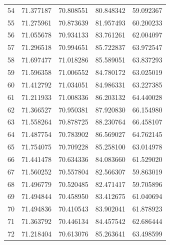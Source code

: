 \begin{table}
\begin{tabular}{rrrrr}
54 & 71.377187 & 70.808551 & 80.848342 & 59.092367 \\
55 & 71.275961 & 70.873639 & 81.957493 & 60.200233 \\
56 & 71.055678 & 70.934133 & 83.761261 & 62.004097 \\
57 & 71.296518 & 70.994651 & 85.722837 & 63.972547 \\
58 & 71.697477 & 71.018286 & 85.589051 & 63.837293 \\
59 & 71.596358 & 71.006552 & 84.780172 & 63.025019 \\
60 & 71.412792 & 71.034051 & 84.986331 & 63.227385 \\
61 & 71.211933 & 71.008336 & 86.203132 & 64.440028 \\
62 & 71.366527 & 70.950381 & 87.920830 & 66.154980 \\
63 & 71.558264 & 70.878725 & 88.230764 & 66.458107 \\
64 & 71.487754 & 70.783902 & 86.569027 & 64.762145 \\
65 & 71.754075 & 70.709228 & 85.258100 & 63.014978 \\
66 & 71.441478 & 70.634336 & 84.083660 & 61.529020 \\
67 & 71.560252 & 70.557804 & 82.566307 & 59.863019 \\
68 & 71.496779 & 70.520485 & 82.471417 & 59.705896 \\
69 & 71.494844 & 70.458950 & 83.412675 & 61.040694 \\
70 & 71.494836 & 70.410543 & 83.902041 & 61.878923 \\
71 & 71.363792 & 70.446134 & 84.457542 & 62.686444 \\
72 & 71.218404 & 70.613076 & 85.263641 & 63.498599 \\
\bottomrule
\end{tabular}
\end{table}
